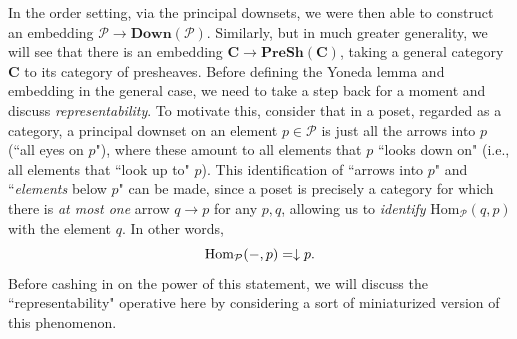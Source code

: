 \documentclass[a4paper]{book}
\theoremstyle{definition}
\theoremstyle{definition}
\theoremstyle{definition}
\theoremstyle{theorem}
\theoremstyle{definition}
\begin{document}
In the order setting, via the principal downsets, we were then able to construct an embedding $\mathcal{P} \rightarrow \textbf{Down}(\mathcal{P})$. Similarly, but in much greater generality, we will see that there is an embedding $\textbf{C} \rightarrow \textbf{PreSh}(\textbf{C})$, taking a general category $\textbf{C}$ to its category of presheaves. Before defining the Yoneda lemma and embedding in the general case, we need to take a step back for a moment and discuss \textit{representability}. To motivate this, consider that in a poset, regarded as a category, a principal downset on an element $p \in \mathcal{P}$ is just all the arrows into $p$ (``all eyes on $p$"), where these amount to all elements that $p$ ``looks down on" (i.e., all elements that ``look up to" $p$). This identification of ``arrows into $p$" and ``\textit{elements} below $p$" can be made, since a poset is precisely a category for which there is \textit{at most one} arrow $q \rightarrow p$ for any $p, q$, allowing us to \textit{identify} $\text{Hom}_{\mathcal{P}}(q, p)$ with the element $q$. In other words, 
\begin{equation*} 
\text{Hom}_{\mathcal{P}}(\--, p) = \downarrow p . 
\end{equation*} 
Before cashing in on the power of this statement, we will discuss the ``representability" operative here by considering a sort of miniaturized version of this phenomenon. 
\end{document}
